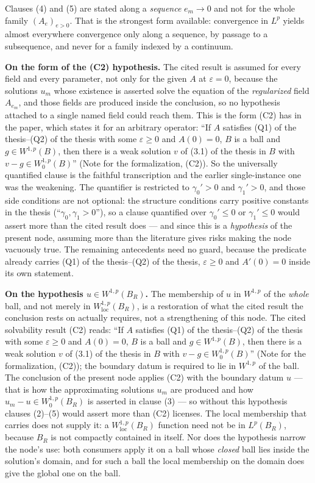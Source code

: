 \begin{helper}
Clauses (4) and (5) are stated along a \emph{sequence} $e_m\to0$ and not for the
whole family $(A_e)_{e>0}$.  That is the strongest form available: convergence
in $L^p$ yields almost everywhere convergence only along a sequence, by passage
to a subsequence, and never for a family indexed by a continuum.

\textbf{On the form of the (C2) hypothesis.}  The cited result is assumed for
every field and every parameter, not only for the given $A$ at
$\varepsilon=0$, because the solutions $u_m$ whose existence is asserted solve
the equation of the \emph{regularized} field $A_{e_m}$, and those fields are
produced inside the conclusion, so no hypothesis attached to a single named
field could reach them.  This is the form (C2) has in the paper, which states it
for an arbitrary operator: ``If $A$ satisfies (Q1) of the thesis--(Q2) of the thesis with
some $\varepsilon\ge0$ and $A(0)=0$, $B$ is a ball and $g\in W^{1,p}(B)$, then
there is a weak solution $v$ of (3.1) of the thesis in $B$ with
$v-g\in W^{1,p}_0(B)$'' (Note for the formalization, (C2)).  So the universally
quantified clause is the faithful transcription and the earlier
single-instance one was the weakening.  The quantifier is restricted to
$\gamma_0'>0$ and $\gamma_1'>0$, and those side conditions are not optional: the
structure conditions carry positive constants in the thesis
(``$\gamma_0,\gamma_1>0$''), so a clause quantified over $\gamma_0'\le0$ or
$\gamma_1'\le0$ would assert more than the cited result does --- and since this
is a \emph{hypothesis} of the present node, assuming more than the literature
gives risks making the node vacuously true.  The remaining antecedents need no
guard, because the predicate  already carries
(Q1) of the thesis--(Q2) of the thesis, $\varepsilon\ge0$ and $A'(0)=0$ inside its own
statement.

\textbf{On the hypothesis $u\in W^{1,p}(B_R)$.}  The membership of $u$ in
$W^{1,p}$ of the \emph{whole} ball, and not merely in
$W^{1,p}_{\mathrm{loc}}(B_R)$, is a restoration of what the cited result the
conclusion rests on actually requires, not a strengthening of this node.  The
cited solvability result (C2) reads: ``If $A$ satisfies
(Q1) of the thesis--(Q2) of the thesis with some $\varepsilon\ge0$ and $A(0)=0$, $B$ is a
ball and $g\in W^{1,p}(B)$, then there is a weak solution $v$ of
(3.1) of the thesis in $B$ with $v-g\in W^{1,p}_0(B)$'' (Note for the formalization,
(C2)); the boundary datum is required to lie in $W^{1,p}$ of the ball.  The
conclusion of the present node applies (C2) with the boundary datum $u$ --- that
is how the approximating solutions $u_m$ are produced and how
$u_m-u\in W^{1,p}_0(B_R)$ is asserted in clause (3) --- so without this
hypothesis clauses (2)--(5) would assert more than (C2) licenses.  The local
membership that  carries does not supply it: a
$W^{1,p}_{\mathrm{loc}}(B_R)$ function need not be in $L^p(B_R)$, because $B_R$
is not compactly contained in itself.  Nor does the hypothesis narrow the node's
use: both consumers apply it on a ball whose \emph{closed} ball lies inside the
solution's domain, and for such a ball the local membership on the domain does
give the global one on the ball.


\end{helper}
